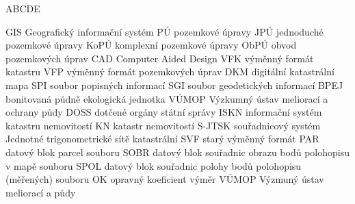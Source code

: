 
\begin{seznamzkratek}{ABCDE}

	      {GIS}
	      {Geografický informační systém}
	      {PÚ}
	      {pozemkové úpravy}
	      {JPÚ}
	      {jednoduché pozemkové úpravy}
	      {KoPÚ}
	      {komplexní pozemkové úpravy}
	      {ObPÚ}
	      {obvod pozemkových úprav}
	      {CAD}
	      {Computer Aided Design}
	      {VFK}
	      {výměnný formát katastru}
	      {VFP}
	      {výměnný formát pozemkových úprav}
	      {DKM}
	      {digitální katastrální mapa}
	      {SPI}
	      {soubor popisných informací}
	      {SGI}
	      {soubor geodetických informací}
	      {BPEJ}
	      {bonitovaná půdně ekologická jednotka}
	      {VÚMOP}
	      {Výzkumný ústav meliorací a ochrany půdy}
	      {DOSS}
	      {dotčené orgány státní správy}
	      {ISKN}
	      {informační systém katastru nemovitostí}
	      {KN}
	      {katastr nemovitostí}
	      {S-JTSK}
	      {souřadnicový systém Jednotné trigonometrické sítě katastrální}
	      {SVF}
	      {starý výměnný formát}
	      {PAR}
	      {datový blok parcel souboru }
	      {SOBR}
	      {datový blok souřadnic obrazu bodů polohopisu v mapě souboru }
	      {SPOL}
	      {datový blok souřadnic polohy bodů polohopisu (měřených) souboru }
	      {OK}
	      {opravný koeficient výměr}
	      {VÚMOP}
	      {Výzmuný ústav meliorací a půdy}
	      
\end{seznamzkratek}